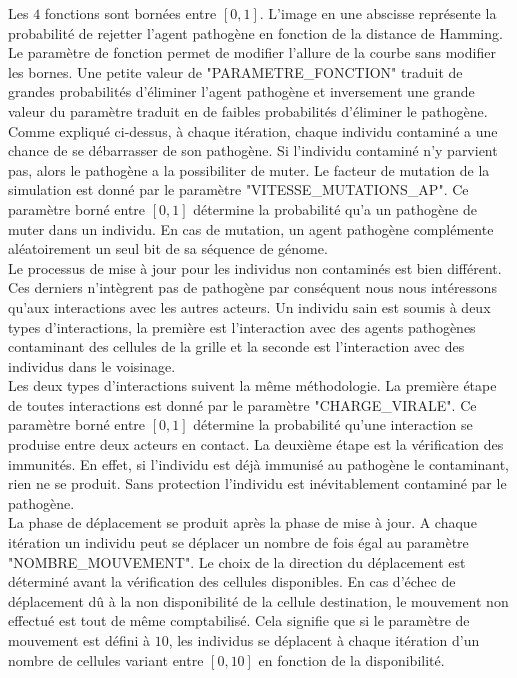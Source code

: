 Les $4$ fonctions sont bornées entre $[0,1]$. L'image en une abscisse représente la probabilité de rejetter l'agent pathogène en fonction de la distance de Hamming. Le paramètre de fonction permet de modifier l'allure de la courbe sans modifier les bornes. Une petite valeur de {\small "PARAMETRE\_FONCTION"} traduit de grandes probabilités d'éliminer l'agent pathogène et inversement une grande valeur du paramètre traduit en de faibles probabilités d'éliminer le pathogène.\\

Comme expliqué ci-dessus, à chaque itération, chaque individu contaminé a une chance de se débarrasser de son pathogène. Si l'individu contaminé n'y parvient pas, alors le pathogène a la possibiliter de muter. Le facteur de mutation de la simulation est donné par le paramètre {\small "VITESSE\_MUTATIONS\_AP"}. Ce paramètre borné entre $[0,1]$ détermine la probabilité qu'a un pathogène de muter dans un individu. En cas de mutation, un agent pathogène complémente aléatoirement un seul bit de sa séquence de génome.\\

Le processus de mise à jour pour les individus non contaminés est bien différent. Ces derniers n'intègrent pas de pathogène par conséquent nous nous intéressons qu'aux interactions avec les autres acteurs. Un individu sain est soumis à deux types d'interactions, la première est l'interaction avec des agents pathogènes contaminant des cellules de la grille et la seconde est l’interaction avec des individus dans le voisinage.\\

Les deux types d'interactions suivent la même méthodologie. La première étape de toutes interactions est donné par le paramètre {\small "CHARGE\_VIRALE"}. Ce paramètre borné entre $[0,1]$ détermine la probabilité qu'une interaction se produise entre deux acteurs en contact. La deuxième étape est la vérification des immunités. En effet, si l'individu est déjà immunisé au pathogène le contaminant, rien ne se produit. Sans protection l'individu est inévitablement contaminé par le pathogène.\\

La phase de déplacement se produit après la phase de mise à jour. A chaque itération un individu peut se déplacer un nombre de fois égal au paramètre {\small "NOMBRE\_MOUVEMENT"}. Le choix de la direction du déplacement est déterminé avant la vérification des cellules disponibles. En cas d'échec de déplacement dû à la non disponibilité de la cellule destination, le mouvement non effectué est tout de même comptabilisé. Cela signifie que si le paramètre de mouvement est défini à $10$, les individus se déplacent à chaque itération d'un nombre de cellules variant entre $[0,10]$ en fonction de la disponibilité.\\

